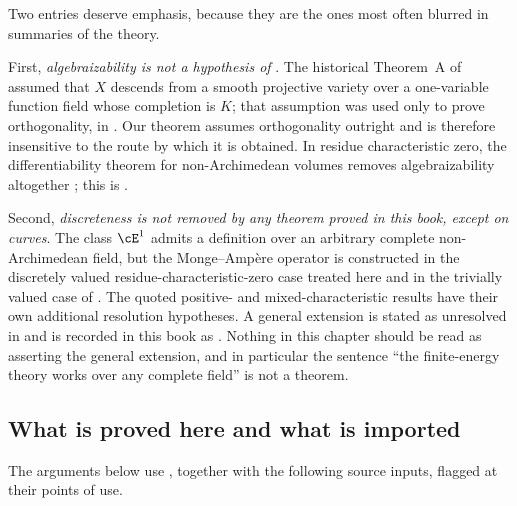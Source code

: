 Two entries deserve emphasis, because they are the ones most often blurred
in summaries of the theory.

First, \emph{algebraizability is not a hypothesis of
}.  The historical Theorem~A of \cite{BFJ15}
assumed that $X$ descends from a smooth projective variety over a
one-variable function field whose completion is $K$; that assumption was
used only to prove orthogonality, in \cite[Appendix~A]{BFJ15}.  Our theorem
assumes orthogonality outright and is therefore insensitive to the route by
which it is obtained.  In residue characteristic zero, the differentiability
theorem for non-Archimedean volumes removes algebraizability altogether
\cite[Theorem~6.3.3 and Corollary~6.3.4]{BGGJKM20}; this is
.

Second, \emph{discreteness is not removed by any theorem proved in this
book, except on curves}.  The class $\cE^1$ admits a definition over an
arbitrary complete non-Archimedean field, but the Monge--Amp\`ere operator
is constructed in the discretely valued residue-characteristic-zero
case treated here and in the trivially valued case of .
The quoted positive- and mixed-characteristic results have their own
additional resolution hypotheses.  A general extension is stated as
unresolved in
\cite[Remark~4.4]{PS23Hybrid} and is recorded in this book as
.  Nothing in this chapter should be read as
asserting the general extension, and in particular the sentence ``the
finite-energy theory works over any complete field'' is not a theorem.

\subsection{What is proved here and what is imported}
\label{sec:ch28-imported}

The arguments below use
,
together with the following source inputs, flagged at their points of use.

